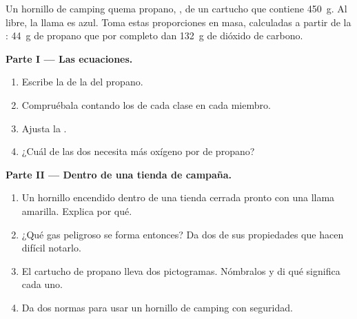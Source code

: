 \begin{problem}
\label{pb:g8:combustion-and-fuels:1}
Un hornillo de camping quema propano, , de un cartucho que
contiene \qty{450}{g}. Al  libre, la llama es azul. Toma estas
proporciones en masa, calculadas a partir de la :
\qty{44}{g} de propano que  por completo dan \qty{132}{g} de
dióxido de carbono.

\medskip
\noindent\textbf{Parte I --- Las ecuaciones.}
\begin{enumerate}
  \item Escribe la  de la  del
        propano.
  \item Compruébala contando los  de cada clase en cada miembro.
  \item Ajusta la 
        . %
  \item ¿Cuál de las dos necesita más oxígeno por  de propano?
\end{enumerate}

\medskip
\noindent\textbf{Parte II --- Dentro de una tienda de campaña.}
\begin{enumerate}[resume]
  \item Un hornillo encendido dentro de una tienda cerrada pronto 
        con una llama amarilla. Explica por qué.
  \item ¿Qué gas peligroso se forma entonces? Da dos de sus propiedades
        que hacen difícil notarlo.
  \item El cartucho de propano lleva dos pictogramas. Nómbralos y di qué
        significa cada uno.
  \item Da dos normas para usar un hornillo de camping con seguridad.
\end{enumerate}


\end{problem}
